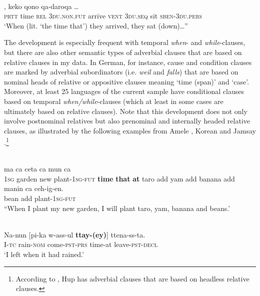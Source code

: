 \documentclass[output=paper]{langsci/langscibook}
\begin{document}
\ea\label{ex:diessel:11}
\\
,  keko  qono  qa-daroqa …\\
        \textsc{prtt}   time  \textsc{rel}   3\textsc{du.non.fut}  arrive  \textsc{vent}  \textsc{3du.seq}  sit  \textsc{sben-3du.pers}\\
\glt   `When (lit. ‘the time that’) they arrived, they sat (down)…”
\z

The development is especially frequent with temporal \textit{when}- and \textit{while}-clauses, but there are also other semantic types of adverbial clauses that are based on relative clauses in my data. In German, for instance, cause and condition clauses are marked by adverbial subordinators (i.e. \textit{weil} and \textit{falls}) that are based on nominal heads of relative or appositive clauses meaning ‘time (span)’ and ‘case’. Moreover, at least 25 languages of the current sample have conditional clauses based on temporal \textit{when/while}-clauses (which at least in some cases are ultimately based on relative clauses). Note that this development does not only involve postnominal relatives but also prenominal and internally headed relative clauses, as illustrated by the following examples from Amele , Korean  and Jamsay .\footnote{According to \citet{Epps2009_RC}, Hup has adverbial clauses that are based on headless relative clauses.} 

\ea\label{ex:diessel:12}
\\
   ma   ca  ceta  ca   mun    ca\\
        1\textsc{sg}   garden   new   plant-1\textsc{sg-fut}   \textbf{time}   \textbf{that   }\textbf{at}   taro   add  yam  add  banana  add\\
\gll   manin    ca  ceh-ig-en.\\
       bean    add  plant-\textsc{1sg-fut}\\
\glt “When I plant my new garden, I will plant taro, yam, banana and beans.'
\z

\ea\label{ex:diessel:13}
\\
\gll   Na-nun  [pi-ka  w-ass-ul   \textbf{ttay-(ey)}]    ttena-ss-ta.\\
       I-\textsc{tc}  rain-\textsc{nom}  come-\textsc{pst-prs}  time-at     leave-\textsc{pst-decl}\\
\glt   `I left when it had rained.' 
\z
\end{document}
